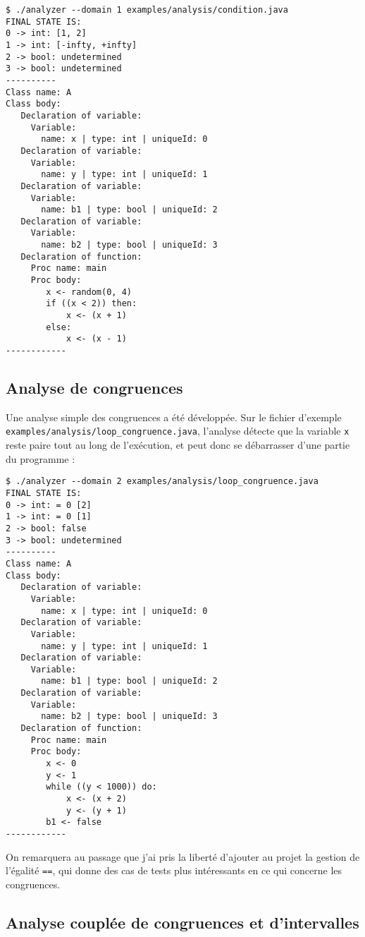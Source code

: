 \documentclass[paper=a4, fontsize=11pt]{scrartcl}
\numberwithin{figure}{section}			%
\numberwithin{table}{section}				%
\begin{document}
\begin{verbatim}
$ ./analyzer --domain 1 examples/analysis/condition.java
FINAL STATE IS:
0 -> int: [1, 2]
1 -> int: [-infty, +infty]
2 -> bool: undetermined
3 -> bool: undetermined
----------
Class name: A
Class body:
   Declaration of variable:
     Variable:
       name: x | type: int | uniqueId: 0
   Declaration of variable:
     Variable:
       name: y | type: int | uniqueId: 1
   Declaration of variable:
     Variable:
       name: b1 | type: bool | uniqueId: 2
   Declaration of variable:
     Variable:
       name: b2 | type: bool | uniqueId: 3
   Declaration of function:
     Proc name: main
     Proc body:
        x <- random(0, 4)
        if ((x < 2)) then:
            x <- (x + 1)
        else:
            x <- (x - 1)
------------
\end{verbatim}

\subsection{Analyse de congruences}

Une analyse simple des congruences a été développée. Sur le fichier d'exemple \texttt{examples/analysis/loop\_congruence.java}, l'analyse détecte que la variable \texttt{x} reste paire tout au long de l'exécution, et peut donc se débarrasser d'une partie du programme :

\begin{verbatim}
$ ./analyzer --domain 2 examples/analysis/loop_congruence.java
FINAL STATE IS:
0 -> int: = 0 [2]
1 -> int: = 0 [1]
2 -> bool: false
3 -> bool: undetermined
----------
Class name: A
Class body:
   Declaration of variable:
     Variable:
       name: x | type: int | uniqueId: 0
   Declaration of variable:
     Variable:
       name: y | type: int | uniqueId: 1
   Declaration of variable:
     Variable:
       name: b1 | type: bool | uniqueId: 2
   Declaration of variable:
     Variable:
       name: b2 | type: bool | uniqueId: 3
   Declaration of function:
     Proc name: main
     Proc body:
        x <- 0
        y <- 1
        while ((y < 1000)) do:
            x <- (x + 2)
            y <- (y + 1)
        b1 <- false
------------
\end{verbatim}

On remarquera au passage que j'ai pris la liberté d'ajouter au projet la gestion de l'égalité \texttt{==}, qui donne des cas de tests plus intéressants en ce qui concerne les congruences.

\subsection{Analyse couplée de congruences et d'intervalles}
\end{document}

